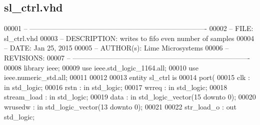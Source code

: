 \subsection{sl\+\_\+ctrl.\+vhd}
\label{sl__ctrl_8vhd_source}

\begin{DoxyCode}
00001 \textcolor{keyword}{-- ---------------------------------------------------------------------------- }
00002 \textcolor{keyword}{-- FILE:    sl\_ctrl.vhd}
00003 \textcolor{keyword}{-- DESCRIPTION: writes to fifo even number of samples}
00004 \textcolor{keyword}{-- DATE:    Jan 25, 2015}
00005 \textcolor{keyword}{-- AUTHOR(s):   Lime Microsystems}
00006 \textcolor{keyword}{-- REVISIONS:}
00007 \textcolor{keyword}{-- ---------------------------------------------------------------------------- }
00008 \textcolor{vhdlkeyword}{library }\textcolor{keywordflow}{ieee};
00009 \textcolor{vhdlkeyword}{use }ieee.std\_logic\_1164.\textcolor{keywordflow}{all};
00010 \textcolor{vhdlkeyword}{use }ieee.numeric\_std.\textcolor{keywordflow}{all};
00011 
00012 
00013 \textcolor{keywordflow}{entity }sl_ctrl \textcolor{keywordflow}{is}
00014 \textcolor{keywordflow}{port}\textcolor{vhdlchar}{(}
00015     \textcolor{vhdlchar}{clk}     \textcolor{vhdlchar}{:} \textcolor{keywordflow}{in} \textcolor{comment}{std\_logic};
00016     \textcolor{vhdlchar}{rstn}    \textcolor{vhdlchar}{:} \textcolor{keywordflow}{in} \textcolor{comment}{std\_logic};
00017     \textcolor{vhdlchar}{wrreq}   \textcolor{vhdlchar}{:} \textcolor{keywordflow}{in} \textcolor{comment}{std\_logic};
00018     \textcolor{vhdlchar}{stream_load} \textcolor{vhdlchar}{:} \textcolor{keywordflow}{in} \textcolor{comment}{std\_logic};
00019     \textcolor{vhdlchar}{data}        \textcolor{vhdlchar}{:} \textcolor{keywordflow}{in} \textcolor{comment}{std\_logic\_vector}\textcolor{vhdlchar}{(}\textcolor{vhdllogic}{}\textcolor{vhdllogic}{15} \textcolor{keywordflow}{downto} \textcolor{vhdllogic}{}\textcolor{vhdllogic}{0}\textcolor{vhdlchar}{)};
00020     \textcolor{vhdlchar}{wrusedw}     \textcolor{vhdlchar}{:} \textcolor{keywordflow}{in} \textcolor{comment}{std\_logic\_vector}\textcolor{vhdlchar}{(}\textcolor{vhdllogic}{}\textcolor{vhdllogic}{13} \textcolor{keywordflow}{downto} \textcolor{vhdllogic}{}\textcolor{vhdllogic}{0}\textcolor{vhdlchar}{)};
00021     
00022     \textcolor{vhdlchar}{str_load_o}  \textcolor{vhdlchar}{:} \textcolor{keywordflow}{out} \textcolor{comment}{std\_logic};

\end{DoxyCode}
